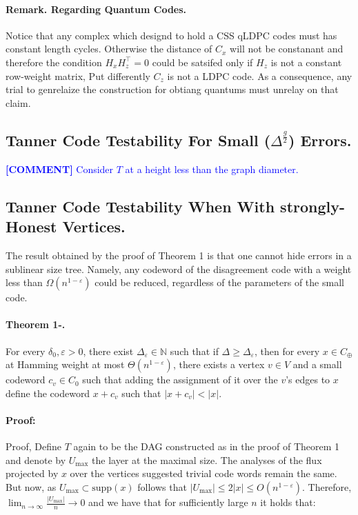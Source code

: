 \documentclass{article}
\newcommand{\commentt}[1]{\textcolor{blue}{ \textbf{[COMMENT]} #1}}
\newcommand{\ctt}[1]{\commentt{#1}}
\begin{document}
\begin{multicols*}{2}
  \paragraph{Remark. Regarding Quantum Codes.} Notice that any complex which designd to hold a CSS qLDPC codes must has constant length cycles. Otherwise the distance of $C_{x}$ will not be constanant and therefore the condition $H_{x}H_{z}^{\top} =0$ could be satsifed only if $H_{z}$ is not a constant row-weight matrix, Put differently $C_{z}$ is not a LDPC code. As a consequence, any trial to genrelaize the construction for obtiang quantums must unrelay on that claim.    

  \subsection{Tanner Code Testability For Small ($ \Delta^{\frac{g}{2}} $) Errors.} 
  \ctt{Consider $T$ at a height less than the graph diameter.  } 
  \subsection{Tanner Code Testability When With strongly-Honest Vertices. }
  The result obtained by the proof of Theorem 1 is that one cannot hide errors in a sublinear size tree. Namely, any codeword of the disagreement code with a weight less than $ \Omega \left( n^{1-\varepsilon} \right) $ could be reduced, regardless of the parameters of the small code. 
  \paragraph{Theorem 1-.} For every $\delta_{0}, \varepsilon > 0$, there exist $\Delta_{\varepsilon}\in \mathbb{N}$ such that if $\Delta \ge \Delta_{\varepsilon}$, then for every $x \in C_{\oplus}$ at Hamming weight at most $ \Theta \left( n^{1-\varepsilon} \right) $, there exists a vertex $v \in V$ and a small codeword $c_{v} \in C_{0} $ such that adding the assignment of it over the $v$'s edges to $x$ define the codeword $x + c_{v}$  such that $|x + c_{v}| < |x|$.  
  \paragraph{Proof:} Proof, Define $T$ again to be the DAG constructed as in the proof of Theorem 1 and denote by $U_{\max}$ the layer at the maximal size. The analyses of the flux projected by $x$ over the vertices suggested trivial code words remain the same. But now, as $U_{\max} \subset \text{supp}(x)$ follows that $|U_{\max}| \le 2|x| \le O(n^{1-\varepsilon})$. Therefore, $ \lim_{n \rightarrow \infty} \frac{|U_{\max}|}{n} \rightarrow 0 $ and we have that for sufficiently large $n$ it holds that: 


\end{multicols*}
\end{document}
